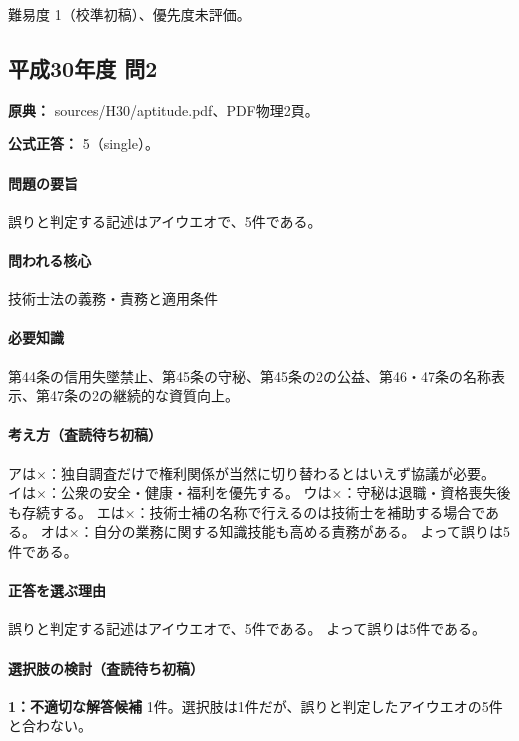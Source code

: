 \par 難易度 1（校準初稿）、優先度未評価。

\subsection{平成30年度 問2}
\label{q:h30-reg-apt-02}

\noindent\textbf{原典：} sources/H30/aptitude.pdf、PDF物理2頁。

\textbf{公式正答：} 5（single）。

\paragraph{問題の要旨} 誤りと判定する記述はアイウエオで、5件である。

\paragraph{問われる核心} 技術士法の義務・責務と適用条件

\paragraph{必要知識} 第44条の信用失墜禁止、第45条の守秘、第45条の2の公益、第46・47条の名称表示、第47条の2の継続的な資質向上。

\paragraph{考え方（査読待ち初稿）} アは×：独自調査だけで権利関係が当然に切り替わるとはいえず協議が必要。 イは×：公衆の安全・健康・福利を優先する。 ウは×：守秘は退職・資格喪失後も存続する。 エは×：技術士補の名称で行えるのは技術士を補助する場合である。 オは×：自分の業務に関する知識技能も高める責務がある。 よって誤りは5件である。

\paragraph{正答を選ぶ理由} 誤りと判定する記述はアイウエオで、5件である。  よって誤りは5件である。

\paragraph{選択肢の検討（査読待ち初稿）}\mbox{}\par

\noindent\textbf{1：不適切な解答候補} 1件。選択肢は1件だが、誤りと判定したアイウエオの5件と合わない。\par

